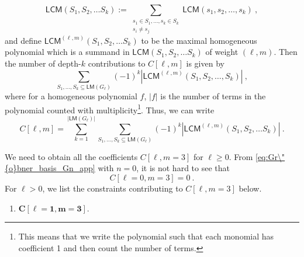\documentclass[a4paper,10pt]{article}
\newcommand{\mr}[1]{\mathsf{#1}}
\newcommand{\myRed}[1]{\textcolor{red}{#1}}
\begin{document}
\begin{appendix}
\begin{equation}
    \mr{LCM}(S_1,S_2,\dots S_k) := \sum_{\substack{s_1 \in S_1,\dots, s_k\in S_k\\
    s_i \neq s_j}} 
    \mr{LCM}(s_1,s_2,\dots, s_k)~,
\end{equation}
and define $\mr{LCM}^{(\ell,m)}(S_1,S_2,\dots S_k)$ to be the maximal homogeneous polynomial which is a summand in $\mr{LCM}(S_1,S_2,\dots S_k)$ of weight $(\ell,m)$. Then the number of depth-$k$ contributions to $C[\ell,m]$ is given by 
\begin{equation}
    \sum_{S_1,\dots,S_k\subseteq \mr{LM}(G_\ell)}(-1)^k|\mr{LCM}^{(\ell,m)}(S_1,S_2,\dots, S_k)|~,
\end{equation}
where for a homogeneous polynomial $f$, $|f|$ is the number of terms in the polynomial counted with multiplicity\footnote{This means that we write the polynomial such that each monomial has coefficient 1 and then count the number of terms.}. Thus, we can write 
\begin{equation}
    C[\ell,m]=\sum_{k=1}^{|\mr{LM}(G_\ell)|}\sum_{S_1,\dots,S_k\subseteq \mr{LM}(G_\ell)}(-1)^k|\mr{LCM}^{(\ell,m)}(S_1,S_2,\dots S_k)|~.
\end{equation}
\par
We need to obtain all the coefficients $C[\ell,m=3]$ for $\ell\geq 0$. From \eqref{eq:Gr\"{o}bner_basis_Gn_app} with $n=0$, it is not hard to see  that
\begin{equation}
    C[\ell=0, m =3] = 0~.
\end{equation}
For $\ell>0$, we list the constraints contributing to $C[\ell, m =3]$ below. 

\begin{enumerate}
\item $\boldsymbol{C[\ell=1, m=3].}$


\end{enumerate}
\end{appendix}
\end{document}
